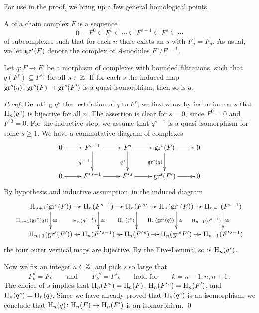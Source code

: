 For use in the proof, we bring up a few general homological points.

A {\it{}\/} of a chain complex $F$ is a sequence
\[
0=F^0\subseteq F^1\subseteq\cdots\subseteq F^{s-1}\subseteq
F^s\subseteq\cdots
\]
of subcomplexes such that for each $n$ there exists an $s$ with
$F^s_n=F_n$.  As usual, we let ${\operatorname{gr}}^s(F)$ denote the complex of
$A$-modules $F^s/F^{s-1}$.

\begin{lemma}
\label{filtration}
Let $q\colon F \to F'$ be a morphism of complexes with bounded
filtrations, such that $q(F^s)\subseteq F'{}^s$ for all $s \in {\mathbb Z}$.  If
for each $s$ the induced map ${\operatorname{gr}}^s(q)\colon{\operatorname{gr}}^s(F)\to{\operatorname{gr}}^s(F')$ is a
quasi-isomorphism, then so is $q$.
 \end{lemma}

\begin{proof}
Denoting $q^s$ the restriction of $q$ to $F^s$, we first show by
induction on $s$ that ${\operatorname{H}}_n(q^s)$ is bijective for all $n$.  The
assertion is clear for $s=0$, since $F^0=0$ and $F^{\prime\,0} = 0$.
For the inductive step, we assume that $q^{s-1}$ is a quasi-isomorphism
for some $s\ge1$.  We have a commutative diagram of complexes
\[
    \xymatrix{
      0 \ar[r] & F^{s-1} \ar[d]_{q^{s-1}} \ar[r] & F^s \ar[d]_{q^{s}}\ar[r]
                & \gr^s(F) \ar[d]_{\gr^s(q)}\ar[r] & 0 \\
      0 \ar[r] & F^{\prime\,s-1} \ar[r]     & F^{\prime\, s} \ar[r]
                & \gr^s(F') \ar[r] & 0 
      }
\]
By hypothesis and inductive assumption, in the induced diagram
\[  
\xymatrixcolsep{0.65pc}
    \xymatrix{
      \HH_{n+1}(\gr^s(F)) \ar[d]_{\HH_{n+1}(\gr^s(q))}^\cong \ar[r] &
      \HH_n    (F^{s-1})  \ar[d]_{\HH_n(q^{s-1})}^\cong \ar[r] &
      \HH_n    (F^s)  \ar[d]_{\HH_n(q^s)}       \ar[r] &
      \HH_n    (\gr^s(F)) \ar[d]_{\HH_n(\gr^s(q))}^\cong \ar[r] &
      \HH_{n-1}(F^{s-1})  \ar[d]_{\HH_{n-1}(q^{s-1})}^\cong
      \\
      \HH_{n+1}(\gr^s(F'))        \ar[r] &
      \HH_n    (F^{\prime\,s-1})         \ar[r] &
      \HH_n    (F^{\prime\,s})         \ar[r] &
      \HH_n    (\gr^s{F'})         \ar[r] &
      \HH_{n-1}(F^{\prime\,s-1})
      }
\]  
the four outer vertical maps are bijective.  By the Five-Lemma, so is
${\operatorname{H}}_n(q^s)$.

Now we fix an integer $n \in {\mathbb Z}$, and pick $s$ so large that
\[
F^s_{k}=F_{k} \qquad\text{and}\qquad
F^{\prime\, s}_{k}=F'_{k}\qquad\text{hold for}\qquad
k=n-1,n,n+1\,.
\]
The choice of $s$ implies that ${\operatorname{H}}_n(F^{s}) = {\operatorname{H}}_n(F)$,
${\operatorname{H}}_n(F^{\prime\,s}) = {\operatorname{H}}_n(F')$, and ${\operatorname{H}}_n(q^s) = {\operatorname{H}}_n(q)$.  Since
we have already proved that ${\operatorname{H}}_n(q^s)$ is an isomorphism, we conclude
that ${\operatorname{H}}_n(q)\colon {\operatorname{H}}_n(F)\to {\operatorname{H}}_n(F')$ is an isomorphism.
 \qed \end{proof}

